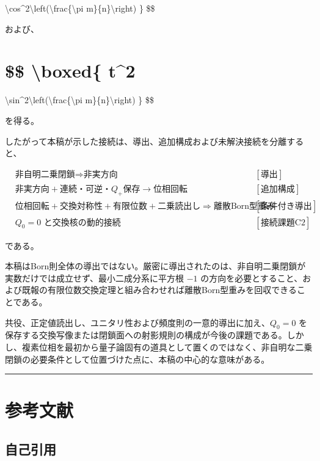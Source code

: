 \documentclass[
  a4paper,
  10pt]{article}
\begin{document}
\textbackslash cos\^{}2\textbackslash left(\textbackslash frac\{\textbackslash pi
m\}\{n\}\textbackslash right) \} \$\$

および、

\section{\$\$ \textbackslash boxed\{
\textbar t\textbar\^{}2}\label{-boxed-t2}

\textbackslash sin\^{}2\textbackslash left(\textbackslash frac\{\textbackslash pi
m\}\{n\}\textbackslash right) \} \$\$

を得る。

したがって本稿が示した接続は、導出、追加構成および未解決接続を分離すると、

\[
\boxed{
\begin{aligned}
&\text{非自明二乗閉鎖}
\Rightarrow
\text{非実方向}
&&[\text{導出}]\\
&\text{非実方向}
+
\text{連続・可逆・}Q_+\text{保存}
\longrightarrow
\text{位相回転}
&&[\text{追加構成}]\\
&\text{位相回転}
+
\text{交換対称性}
+
\text{有限位数}
+
\text{二乗読出し}
\Rightarrow
\text{離散Born型重み}
&&[\text{条件付き導出}]\\
&Q_0=0\text{ と交換核の動的接続}
&&[\text{接続課題C2}]
\end{aligned}
}
\]

である。

本稿はBorn則全体の導出ではない。厳密に導出されたのは、非自明二乗閉鎖が実数だけでは成立せず、最小二成分系に平方根
\(-1\)
の方向を必要とすること、および既報の有限位数交換定理と組み合わせれば離散Born型重みを回収できることである。

共役、正定値読出し、ユニタリ性および頻度則の一意的導出に加え、\(Q_0=0\)
を保存する交換写像または閉鎖面への射影規則の構成が今後の課題である。しかし、複素位相を最初から量子論固有の道具として置くのではなく、非自明な二乗閉鎖の必要条件として位置づけた点に、本稿の中心的な意味がある。

\begin{center}\rule{0.5\linewidth}{0.5pt}\end{center}

\section{参考文献}\label{ux53c2ux8003ux6587ux732e}

\subsection{自己引用}\label{ux81eaux5df1ux5f15ux7528}
\end{document}
